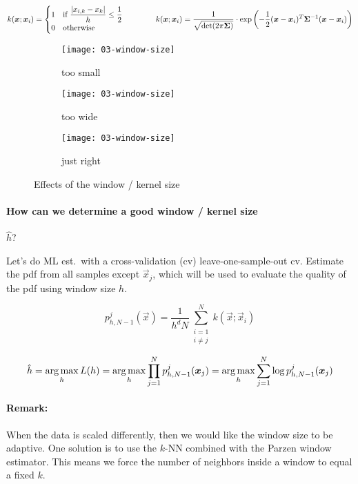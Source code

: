 \begin{equation*}
  k(\bm{x}; \bm{x}_i) = \begin{cases}
    1 &\text{if } \dfrac{|x_{i,k} - x_k|}{h} \le \dfrac{1}{2}\\
    0 &\text{otherwise}
  \end{cases}
  \qquad \qquad
  k(\bm{x}; \bm{x}_i)=\frac{1}{\sqrt{\det(2\pi\bm{\Sigma})}}\cdot\exp\left(-\frac12(\bm{x}-\bm{x}_i)^T\bm{\bm{\Sigma}}^{-1}(\bm{x}-\bm{x}_i)\right)
\end{equation*}

\begin{figure}[H]
  \centering
  \begin{subfigure}[b]{0.3\textwidth}
    \texttt{[image: 03-window-size]}
    \caption{too small}
  \end{subfigure}
  \hfill
  \begin{subfigure}[b]{0.3\textwidth}
    \texttt{[image: 03-window-size]}
    \caption{too wide}
  \end{subfigure}
  \hfill
  \begin{subfigure}[b]{0.3\textwidth}
    \texttt{[image: 03-window-size]}
    \caption{just right}
  \end{subfigure}
  \caption{Effects of the window / kernel size}
\end{figure}

\paragraph{How can we determine a good window / kernel size} $\hat{h}$?

Let's do ML est.\ with a cross-validation (cv) \eg leave-one-sample-out cv. Estimate the pdf from all samples except $\vec{x}_j$, which will be used to evaluate the quality of the pdf using window size $h$.

\begin{equation*}
  p_{h,N-1}^j(\vec{x}) = \dfrac{1}{h^d N} \sum_{\substack{i=1\\i \neq j}}^N k(\vec{x}; \vec{x}_i)
\end{equation*}

\begin{equation*}
  \hat{h} = \operatorname*{arg\,max}_h L(h) = \operatorname*{arg\,max}_h \prod_{j=1}^N p_{h,N-1}^j(\bm{x}_j) = \operatorname*{arg\,max}_h \sum_{j=1}^N \log p_{h,N-1}^j(\bm{x}_j)
\end{equation*}

\paragraph{Remark:}
When the data is scaled differently, then we would like the window size to be adaptive. One solution is to use the $k$-NN combined with the Parzen window estimator. This means we force the number of neighbors inside a window to equal a fixed $k$.
